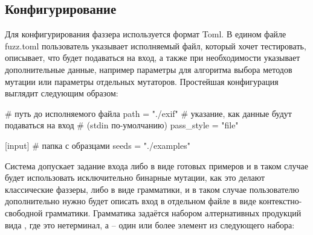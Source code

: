 \subsection{Конфигурирование}

Для конфигурирования фаззера используется формат Toml. В едином файле fuzz.toml пользователь указывает исполняемый файл, который хочет тестировать, описывает, что будет подаваться на вход, а также при необходимости указывает дополнительные данные, например параметры для алгоритма выбора методов мутации или параметры отдельных мутаторов. Простейшая конфигурация выглядит следующим образом:

\begin{code}
[binary]
# путь до исполняемого файла
path = "./exif"
# указание, как данные будут подаваться на вход
# (stdin по-умолчанию)
pass_style = "file"

[input]
# папка с образцами
seeds = "./examples"
\end{code}

Система допускает задание входа либо в виде готовых примеров и в таком случае будет использовать исключительно бинарные мутации, как это делают классические фаззеры, либо в виде грамматики, и в таком случае пользователю дополнительно нужно будет описать вход в отдельном файле в виде контекстно-свободной грамматики. Грамматика задаётся набором алтернативных продукций вида , где  это нетерминал, а  -- один или более элемент из следующего набора:

